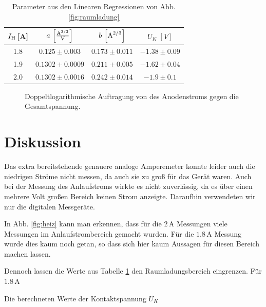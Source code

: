 \documentclass[12pt,a4paper,titlepage,headinclude,bibtotoc]{scrartcl}
\begin{document}
\begin{table}[!h]
\centering
\begin{tabular}{|c|c|c|c|}
\hline
$I_\text H\,$[A]& $a\,\left[\frac{\text A^{2/3}}{\text V}\right]$	& $b\,\left[\text A^{2/3}\right]$ & $U_K \; [V]$	\\\hline\hline
1.8 		& $0.125\pm 0.003$	& $0.173\pm 0.011$		&$-1.38 \pm 0.09$	\\\hline
1.9 		& $0.1302\pm0.0009$ 	& $0.211\pm 0.005$		&$-1.62 \pm 0.04$	\\\hline
2.0 		& $0.1302\pm 0.0016$	& $0.242 \pm 0.014$		&$-1.9 \pm 0.1	$	\\\hline
\end{tabular}
\caption{Parameter aus den Linearen Regressionen von Abb. \ref{fig:raumladung}}
\label{tab:ParaRaum}
\end{table}

\begin{figure}[!h]
\centering

\caption{Doppeltlogarithmische Auftragung von des Anodenstroms gegen die Gesamtspannung.}
\label{fig:expRauml}
\end{figure}

\section{Diskussion}
\label{sec:diskussion}
Das extra bereitstehende genauere analoge Amperemeter konnte leider auch die niedrigen Ströme nicht messen, da auch sie zu groß für das Gerät waren.
Auch bei der Messung des Anlaufstroms wirkte es nicht zuverlässig, da es über einen mehrere Volt großen Bereich keinen Strom anzeigte.
Daraufhin verwendeten wir nur die digitalen Messgeräte.

In Abb. \ref{fig:heiz} kann man erkennen, dass für die $2\,$A Messungen viele Messungen im Anlaufstrombereich gemacht wurden.
Für die $1.8\,$A Messung wurde dies kaum noch getan, so dass sich hier kaum Aussagen für diesen Bereich machen lassen.

Dennoch lassen die Werte aus Tabelle \ref{tab:ParaRaum} den Raumladungsbereich eingrenzen.
Für $1.8\,$A 


Die berechneten Werte der Kontaktspannung $U_K$ 



\end{document}
